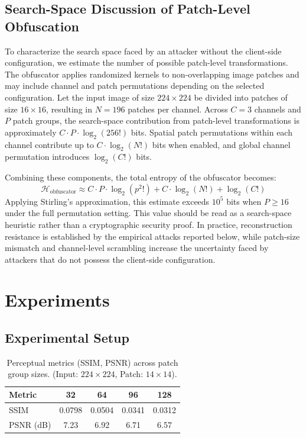 \documentclass{ieeeaccess}
\newcommand{\rev}[1]{{\color{black}#1}}
\begin{document}
\subsection{\rev{Search-Space Discussion of Patch-Level Obfuscation}}

\rev{To characterize the search space faced by an attacker without the client-side configuration, we estimate the number of possible patch-level transformations. The obfuscator applies randomized kernels to non-overlapping image patches and may include channel and patch permutations depending on the selected configuration. Let the input image of size $224 \times 224$ be divided into patches of size $16 \times 16$, resulting in $N = 196$ patches per channel. Across $C = 3$ channels and $P$ patch groups, the search-space contribution from patch-level transformations is approximately $C \cdot P \cdot \log_2(256!)$ bits. Spatial patch permutations within each channel contribute up to $C \cdot \log_2(N!)$ bits when enabled, and global channel permutation introduces $\log_2(C!)$ bits.}

Combining these components, the total entropy of the obfuscator becomes:
\begin{equation}
\mathcal{H}_{\text{obfuscator}} \approx C \cdot P \cdot \log_2(p^2!) + C \cdot \log_2(N!) + \log_2(C!)
\end{equation}
\rev{Applying Stirling's approximation, this estimate exceeds $10^5$ bits when $P \geq 16$ under the full permutation setting. This value should be read as a search-space heuristic rather than a cryptographic security proof. In practice, reconstruction resistance is established by the empirical attacks reported below, while patch-size mismatch and channel-level scrambling increase the uncertainty faced by attackers that do not possess the client-side configuration.}

\section{Experiments} \label{sec:exp}

\subsection{Experimental Setup}

\begin{table}[!t]
\caption{Perceptual metrics (SSIM, PSNR) across patch group sizes. (Input: $224 \times 224$, Patch: $14 \times 14$).}
\label{tab:obf-metrics}
\centering
\begin{tabular}{l|c|c|c|c}
\toprule
\textbf{Metric} & \textbf{32} & \textbf{64} & \textbf{96} & \textbf{128} \\ 
\midrule

SSIM         & 0.0798 & 0.0504 & 0.0341 & 0.0312\\

PSNR (dB)    & 7.23   & 6.92   & 6.71 & 6.57\\
\bottomrule
\end{tabular}
\end{table}
\end{document}
